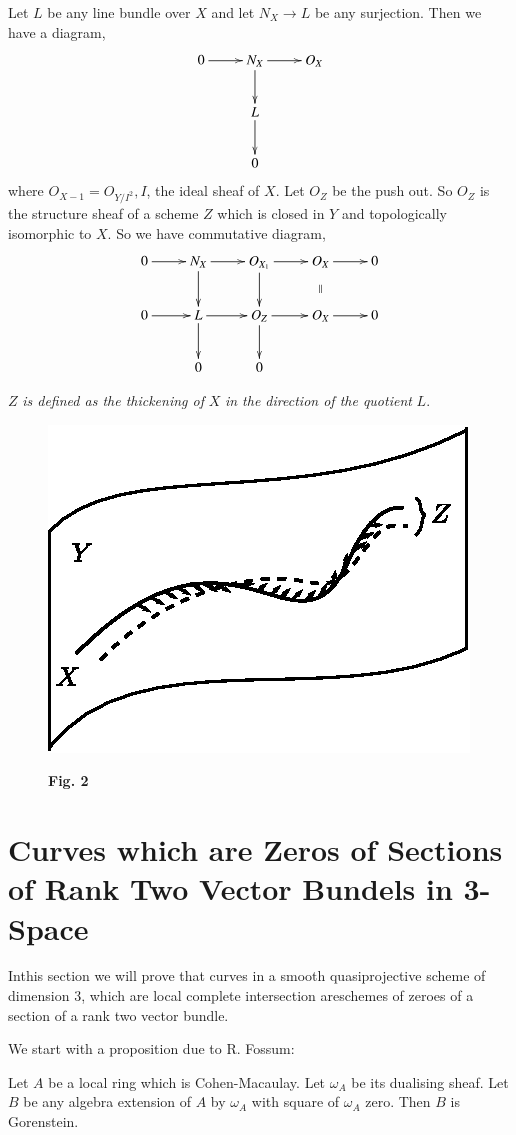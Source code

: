 Let $L$ be any line bundle over $X$ and let $N_X\longrightarrow L$ be
any surjection. Then we have a diagram, 
\[
\xymatrix{
0 \ar[r] &  N_X \ar[d] \ar[r]  & O_X\\
& L \ar[d] &\\
& 0 &
}
\]\pageoriginale
where $O_{X-1}=O_{Y/I^2}, I$, the ideal sheaf of $X$. Let $O_Z$ be the
push out. So $O_Z$ is the structure sheaf of a scheme $Z$ which is
closed in $Y$ and topologically isomorphic to $X$. So we have
commutative diagram,
\[
\xymatrix{
0\ar[r] & N_X\ar[d] \ar[r] & O_{X_1} \ar[d] \ar[r] & O_X \ar @{} [d]
|{\|} \ar[r] & 0\\
0 \ar[r] & L\ar[d] \ar[r] & O_Z\ar[d]\ar[r] & O_X\ar[r] & 0\\
& 0 & 0 & & 
}
\]
\begin{def*}
$Z$ {\it is defined as the thickening of} $X$ {\it in the direction of
the quotient} $L$. 
\begin{figure}[H]
\centering
\includegraphics{figure/chap4-fig2.eps}

\medskip
{\bf Fig. 2}
\end{figure}
\end{def*}

\section[Curves which are Zeros]{Curves which are Zeros of Sections of
  Rank Two Vector Bundels in 3-Space}\label{chap4:sec3}
In\pageoriginale this section we will prove that curves in a smooth
quasiprojective scheme of dimension 3, which are local complete
intersection are\break schemes of zeroes of a section of a rank two vector
bundle. 

We start with a proposition due to R. Fossum:
\begin{Prop*}
Let $A$ be a local ring which is Cohen-Macaulay. Let $\omega_A$ be its
dualising sheaf. Let $B$ be any algebra extension of $A$ by $\omega_A$
with square of $\omega_A$ zero. Then $B$ is Gorenstein.
\end{Prop*}

